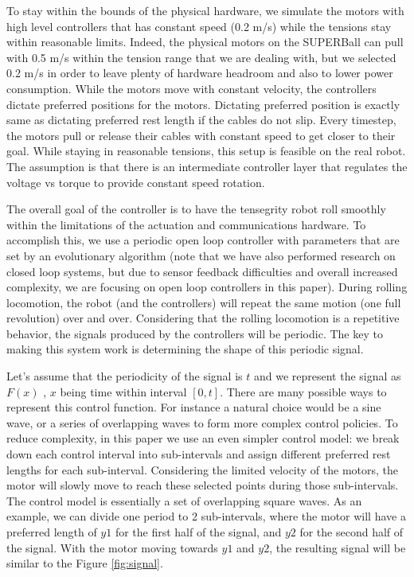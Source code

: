 \documentclass[twocolumn,10pt]{asme2ej}
\begin{document}
To stay within the bounds of the physical hardware, we simulate the motors with high level controllers that has constant speed (0.2 m/s) while the tensions stay within reasonable limits. Indeed, the physical motors on the SUPERBall can pull with 0.5 m/s within the tension range that we are dealing with, but we selected 0.2 m/s in order to leave plenty of hardware headroom and also to lower power consumption. While the motors move with constant velocity, the controllers dictate preferred positions for the motors. Dictating preferred position is exactly same as dictating preferred rest length if the cables do not slip. Every timestep, the motors pull or release their cables with constant speed to get closer to their goal. While staying in reasonable tensions, this setup is feasible on the real robot. The assumption is that there is an intermediate controller layer that regulates the voltage vs torque to provide constant speed rotation.

The overall goal of the controller is to have the tensegrity robot roll smoothly within the limitations of the actuation and communications hardware. To accomplish this, we use a periodic open loop controller with parameters that are set by an evolutionary algorithm (note that we have also performed research on closed loop systems, but due to sensor feedback difficulties and overall increased complexity, we are focusing on open loop controllers in this paper). During rolling locomotion, the robot (and the controllers) will repeat the same motion (one full revolution) over and over. Considering that the rolling locomotion is a repetitive behavior, the signals produced by the controllers will be periodic. The key to making this system work is determining the shape of this periodic signal.

Let's assume that the periodicity of the signal is $t$ and we represent the signal as $F(x)$ , $x$ being time within interval $[0,t]$. There are many possible ways to represent this control function. For instance a natural choice would be a sine wave, or a series of overlapping waves to form more complex control policies. To reduce complexity, in this paper we use an even simpler control model: we break down each control interval into sub-intervals and assign different preferred rest lengths for each sub-interval.  Considering the limited velocity of the motors, the motor will slowly move to reach these selected points during those sub-intervals. The control model is essentially a set of overlapping square waves. As an example, we can divide one period to 2 sub-intervals, where the motor will have a preferred length of $y1$ for the first half of the signal, and $y2$ for the second half of the signal. With the motor moving towards $y1$ and $y2$, the resulting signal will be similar to the Figure \ref{fig:signal}. 
\end{document}
